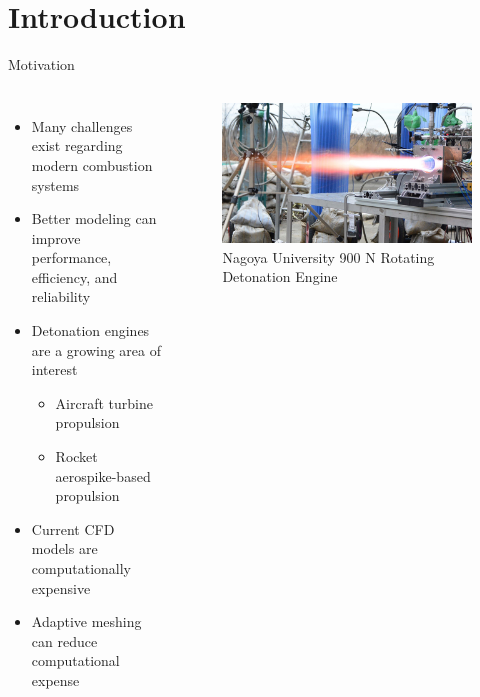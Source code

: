 \section{Introduction}
\begin{frame}{Motivation}
\begin{columns}
\begin{itemize}
\item Many challenges exist regarding modern combustion systems 
\item Better modeling can improve performance, efficiency, and reliability 
\item Detonation engines are a growing area of interest 
\begin{itemize}
    \item Aircraft turbine propulsion
    \item Rocket aerospike-based propulsion
\end{itemize}
\item Current CFD models are computationally expensive
\item Adaptive meshing can reduce computational expense
\end{itemize}	

\begin{figure}
\centering
\includegraphics[width=\textwidth]{../figs/rde.jpg}
\caption{Nagoya University 900 N Rotating Detonation Engine \cite{nagoya}}
\end{figure}
\end{columns}
\end{frame}

